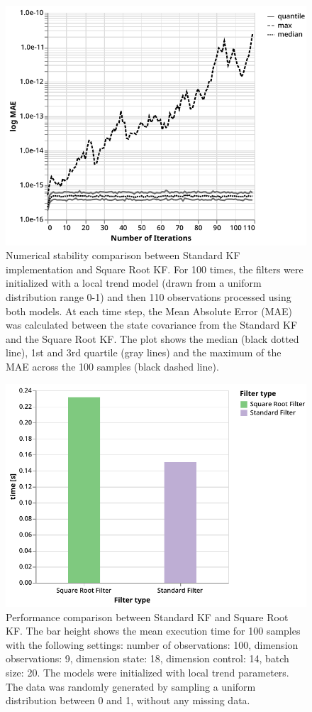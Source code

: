 \documentclass{article}
\begin{document}
\begin{figure}[H]
\includegraphics[width=\textwidth]{numerical_stability}
 \caption{Numerical stability comparison between Standard KF implementation and Square Root KF. For 100 times, the filters were initialized with a local trend model (drawn from a uniform distribution range 0-1) and then 110 observations processed using both models. At each time step, the Mean Absolute Error (MAE) was calculated between the state covariance from the Standard KF and the Square Root KF. The plot shows the median (black dotted line), 1st and 3rd quartile (gray lines) and the maximum of the MAE across the 100 samples (black dashed line).}
 \label{fig:num_stab}
\end{figure}

\begin{figure}
\includegraphics[width=\textwidth]{perf_sr}
 \caption{Performance comparison between Standard KF and Square Root KF. The bar height shows the mean execution time for 100 samples with the following settings: number of observations: 100, dimension observations: 9, dimension state: 18, dimension control: 14, batch size: 20. The models were initialized with local trend parameters. The data was randomly generated by sampling a uniform distribution between 0 and 1, without any missing data.}
 \label{fig:num_stab_perf}
\end{figure}
\end{document}
